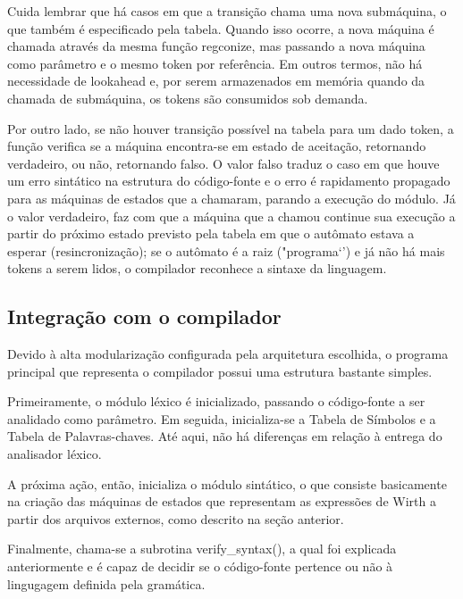   Cuida lembrar que há casos em que a transição chama uma nova submáquina, o que também é especificado pela tabela. Quando isso ocorre, a nova máquina é chamada através da mesma função regconize, mas passando a nova máquina como parâmetro e o mesmo token por referência. Em outros termos, não há necessidade de lookahead e, por serem armazenados em memória quando da chamada de submáquina, os tokens são consumidos sob demanda.


  Por outro lado, se não houver transição possível na tabela para um dado token, a função verifica se a máquina encontra-se em estado de aceitação, retornando verdadeiro, ou não, retornando falso. O valor falso traduz o caso em que houve um erro sintático na estrutura do código-fonte e o erro é rapidamento propagado para as máquinas de estados que a chamaram, parando a execução do módulo. Já o valor verdadeiro, faz com que a máquina que a chamou continue sua execução a partir do próximo estado previsto pela tabela em que o autômato estava a esperar (resincronização); se o autômato é a raiz ("programa`') e já não há mais tokens a serem lidos, o compilador reconhece a sintaxe da linguagem.


  \subsection{Integração com o compilador}


  Devido à alta modularização configurada pela arquitetura escolhida, o programa principal que representa o compilador possui uma estrutura bastante simples. 


  Primeiramente, o módulo léxico é inicializado, passando o código-fonte a ser analidado como parâmetro. Em seguida, inicializa-se a Tabela de Símbolos e a Tabela de Palavras-chaves. Até aqui, não há diferenças em relação à entrega do analisador léxico.


  A próxima ação, então, inicializa o módulo sintático, o que consiste basicamente na criação das máquinas de estados que representam as expressões de Wirth a partir dos arquivos externos, como descrito na seção anterior.

 
 Finalmente, chama-se a subrotina verify\_syntax(), a qual foi explicada anteriormente e é capaz de decidir se o código-fonte pertence ou não à lingugagem definida pela gramática.
